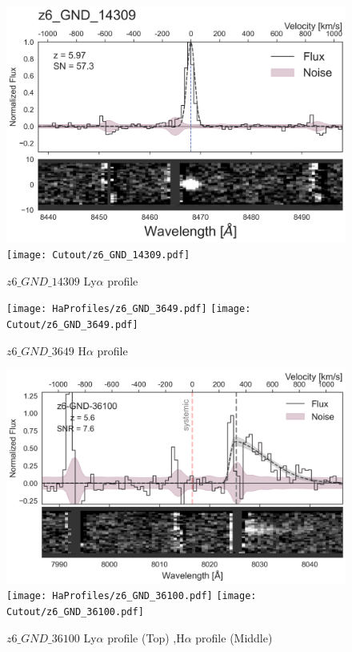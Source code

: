 \documentclass[12pt,english]{article}
\begin{document}
\clearpage
\begin{figure}
\begin{center}\includegraphics[width=12cm, trim=0.1cm 0cm 0cm -1cm]{LyaProfiles/z6_GND_14309.png}
\texttt{[image: Cutout/z6\_GND\_14309.pdf]}
\caption{$z6\_GND\_14309$ Ly$\alpha$ profile}
\end{center}
\end{figure}
\clearpage
\begin{figure}
\begin{center}\texttt{[image: HaProfiles/z6\_GND\_3649.pdf]}
\texttt{[image: Cutout/z6\_GND\_3649.pdf]}
\caption{$z6\_GND\_3649$ H$\alpha$ profile}
\end{center}
\end{figure}
\clearpage
\begin{figure}
\begin{center}\includegraphics[width=12cm, trim=0.1cm 0cm 0cm -1cm]{LyaProfiles/z6_GND_36100.png}
\texttt{[image: HaProfiles/z6\_GND\_36100.pdf]}
\texttt{[image: Cutout/z6\_GND\_36100.pdf]}
\caption{$z6\_GND\_36100$ Ly$\alpha$ profile (Top) ,H$\alpha$ profile (Middle)}
\end{center}
\end{figure}
\end{document}
